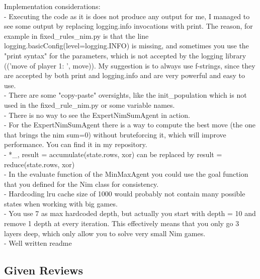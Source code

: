 \begin{tcolorbox}[colback=green!5!white,colframe=green!75!black,code={\singlespacing}]
Implementation considerations: \\
- Executing the code as it is does not produce any output for me, I managed to see some output by replacing logging.info invocations with print. The reason, for example in fixed\_rules\_nim.py is that the line logging.basicConfig(level=logging.INFO) is missing, and sometimes you use the "print syntax" for the parameters, which is not accepted by the logging library (('move of player 1: ', move)). My suggestion is to always use f-strings, since they are accepted by both print and logging.info and are very powerful and easy to use. \\
- There are some "copy-paste" oversights, like the init\_population which is not used in the fixed\_rule\_nim.py or some variable names. \\
- There is no way to see the ExpertNimSumAgent in action. \\
- For the ExpertNimSumAgent there is a way to compute the best move (the one that brings the nim sum=0) without bruteforcing it, which will improve performance. You can find it in my repository. \\
- *\_, result = accumulate(state.rows, xor) can be replaced by result = reduce(state.rows, xor) \\
- In the evaluate function of the MinMaxAgent you could use the goal function that you defined for the Nim class for consistency. \\
- Hardcoding lru cache size of 1000 would probably not contain many possible states when working with big games. \\
- You use 7 as max hardcoded depth, but actually you start with depth = 10 and remove 1 depth at every iteration. This effectively means that you only go 3 layers deep, which only allow you to solve very small Nim games. \\
- Well written readme
\end{tcolorbox}


\subsection{Given Reviews}